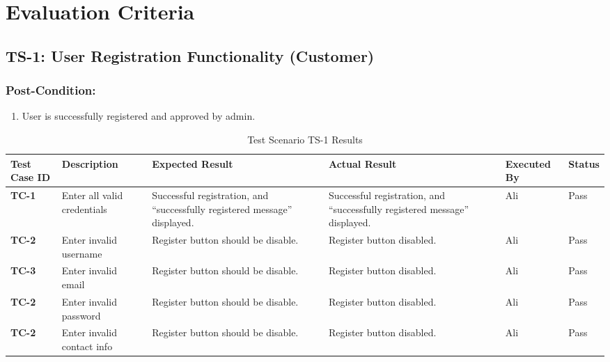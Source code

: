 \newpage
\begingroup%
\makeatletter%
\let\clearpage\relax%
\vspace*{\fill}%
\vspace*{\dimexpr-50\p@-\baselineskip}%
\chapterfont{\centering}
\chapter{Evaluation Criteria}
\vspace*{\fill}%
\endgroup

\newpage
\label{Chapter1}

\section{TS-1: User Registration Functionality (Customer)}
\subsection{Post-Condition:}
\begin{enumerate}
  \item User is successfully registered and approved by admin.
\end{enumerate}

\begin{table}[H]
    \centering
   \begin{tabular}{ | m{1cm} | m{2.3cm}| m{2cm} | m{2cm} | m{1.7cm} | m{1.3cm} |}  
  \hline  \textbf{Test Case ID} &  \textbf{Description} &  \textbf{Expected Result} &  \textbf{Actual Result} &  \textbf{Executed By} &  \textbf{Status}  \\  \hline
  \textbf{TC-1} & Enter all valid credentials & Successful registration, and “successfully registered message” displayed. & Successful registration, and “successfully registered message” displayed. & Ali & Pass
  \\  \hline
  \textbf{TC-2} & Enter invalid username & Register button should be disable. & Register button disabled. & Ali & Pass
  \\  \hline
  \textbf{TC-3} & Enter invalid email & Register button should be disable. & Register button disabled. & Ali & Pass
  \\  \hline
  \textbf{TC-2} & Enter invalid password & Register button should be disable. & Register button disabled. & Ali & Pass
  \\  \hline
  \textbf{TC-2} & Enter invalid contact info & Register button should be disable. & Register button disabled. & Ali & Pass
  \\  \hline
  
\end{tabular}
    \caption{Test Scenario TS-1 Results}
    \label{tab: Test Scenario TS-1 Results}
\end{table}

